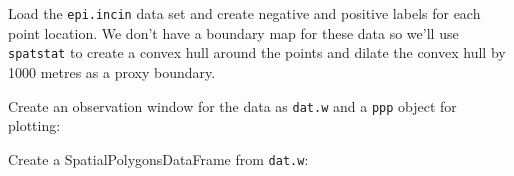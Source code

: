 \documentclass[
]{article}
\newenvironment{Shaded}{\begin{snugshade}}{\end{snugshade}}
\newcommand{\DataTypeTok}[1]{\textcolor[rgb]{0.13,0.29,0.53}{#1}}
\newcommand{\DecValTok}[1]{\textcolor[rgb]{0.00,0.00,0.81}{#1}}
\newcommand{\KeywordTok}[1]{\textcolor[rgb]{0.13,0.29,0.53}{\textbf{#1}}}
\newcommand{\NormalTok}[1]{#1}
\newcommand{\OperatorTok}[1]{\textcolor[rgb]{0.81,0.36,0.00}{\textbf{#1}}}
\newcommand{\StringTok}[1]{\textcolor[rgb]{0.31,0.60,0.02}{#1}}
\begin{document}
Load the \texttt{epi.incin} data set and create negative and positive
labels for each point location. We don't have a boundary map for these
data so we'll use \texttt{spatstat} to create a convex hull around the
points and dilate the convex hull by 1000 metres as a proxy boundary.

Create an observation window for the data as \texttt{dat.w} and a
\texttt{ppp} object for plotting:

\begin{Shaded}
\end{Shaded}

Create a SpatialPolygonsDataFrame from \texttt{dat.w}:
\end{document}
